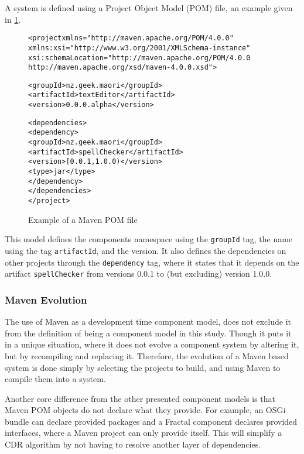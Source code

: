 A system is defined using a Project Object Model (POM) file, an example given in \ref{mavenmetadata}. 

\begin{figure}[htp]
\begin{center}
\begin{alltt}
<project xmlns="http://maven.apache.org/POM/4.0.0"
  xmlns:xsi="http://www.w3.org/2001/XMLSchema-instance"
  xsi:schemaLocation="http://maven.apache.org/POM/4.0.0
                      http://maven.apache.org/xsd/maven-4.0.0.xsd">

  <groupId>nz.geek.maori</groupId>
  <artifactId>textEditor</artifactId>
  <version>0.0.0.alpha</version>

  <dependencies>
    <dependency>
      <groupId>nz.geek.maori</groupId>
      <artifactId>spellChecker</artifactId>
      <version>[0.0.1,1.0.0)</version>
      <type>jar</type>
     </dependency>
  </dependencies>
</project>
\end{alltt}
  \caption[Maven POM file]{Example of a Maven POM file}
  \label{mavenmetadata}
\end{center}
\end{figure}

This model defines the components namespace using the \verb+groupId+ tag, the name using the tag \verb+artifactId+, and the version.
It also defines the dependencies on other projects through the \verb+dependency+ tag,
where it states that it depends on the artifact \verb+spellChecker+ from versions 0.0.1 to (but excluding) version 1.0.0.

\subsubsection{Maven Evolution}
The use of Maven as a development time component model, does not exclude it from the definition of being a component model in this study.
Though it puts it in a unique situation, where it does not evolve a component system by altering it, but by recompiling and replacing it.
Therefore, the evolution of a Maven based system is done simply by selecting the projects to build, and using Maven to compile them into a system. 

Another core difference from the other presented component models is that Maven POM objects do not declare what they provide.
For example, an OSGi bundle can declare provided packages and a Fractal component declares provided interfaces, where a Maven project can only provide itself.
This will simplify a CDR algorithm by not having to resolve another layer of dependencies.

